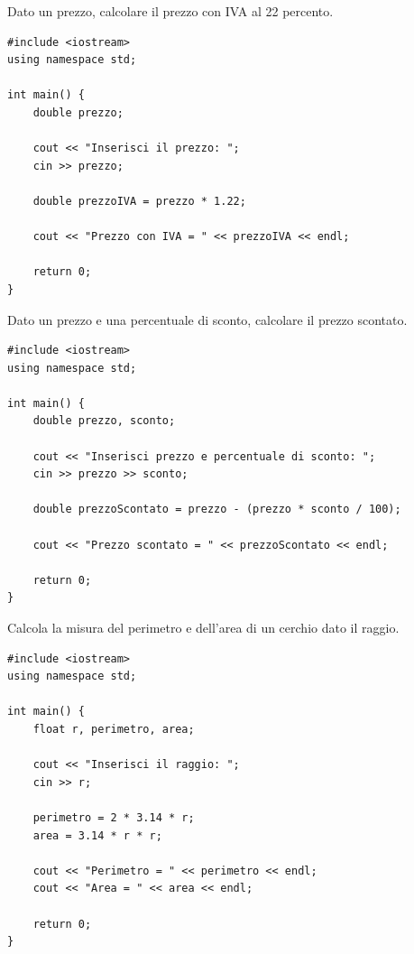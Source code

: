 \documentclass[11pt,fleqn]{book}
\begin{document}
\begin{esercizio}[1]
    Dato un prezzo, calcolare il prezzo con IVA al 22 percento.
    \ifsoluzioni
    \solution
    \begin{lstlisting}[style=cpp]
#include <iostream>
using namespace std;

int main() {
    double prezzo;

    cout << "Inserisci il prezzo: ";
    cin >> prezzo;

    double prezzoIVA = prezzo * 1.22;

    cout << "Prezzo con IVA = " << prezzoIVA << endl;

    return 0;
}
    \end{lstlisting}
    \fi
\end{esercizio}

\begin{esercizio}[1]
    Dato un prezzo e una percentuale di sconto, calcolare il prezzo scontato.
    \ifsoluzioni
    \solution
    \begin{lstlisting}[style=cpp]
#include <iostream>
using namespace std;

int main() {
    double prezzo, sconto;

    cout << "Inserisci prezzo e percentuale di sconto: ";
    cin >> prezzo >> sconto;

    double prezzoScontato = prezzo - (prezzo * sconto / 100);

    cout << "Prezzo scontato = " << prezzoScontato << endl;

    return 0;
}
    \end{lstlisting}
    \fi
\end{esercizio}

\begin{esercizio}[1]
    Calcola la misura del perimetro e dell’area di un cerchio dato il raggio.
    \ifsoluzioni
    \solution
    \begin{lstlisting}[style=cpp]
#include <iostream>
using namespace std;

int main() {
    float r, perimetro, area;
    
    cout << "Inserisci il raggio: ";
    cin >> r;

    perimetro = 2 * 3.14 * r;
    area = 3.14 * r * r;

    cout << "Perimetro = " << perimetro << endl;
    cout << "Area = " << area << endl;

    return 0;
}
    \end{lstlisting}
    \fi
\end{esercizio}
\end{document}
